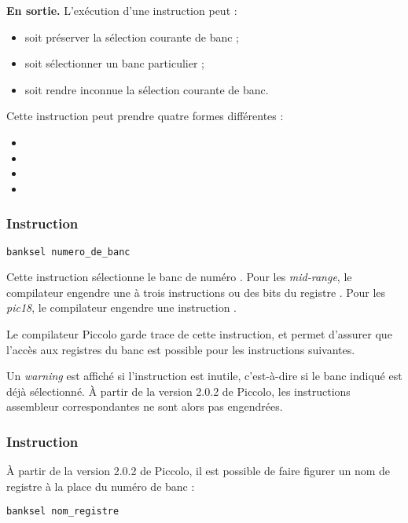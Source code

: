\textbf{En sortie.} L'exécution d'une instruction peut :
\begin{itemize}
  \item soit préserver la sélection courante de banc ;
  \item soit sélectionner un banc particulier ;
  \item soit rendre inconnue la sélection courante de banc.
\end{itemize}


Cette instruction peut prendre quatre formes différentes :
\begin{itemize}
  \item {}
  \item {}
  \item {}
  \item {}
\end{itemize}


\subsubsection{Instruction }
\begin{lstlisting}[language=piccolo]
banksel numero_de_banc
\end{lstlisting}

Cette instruction sélectionne le banc de numéro . Pour les \emph{mid-range}, le compilateur engendre une à trois instructions  ou  des bits  du registre . Pour les \emph{pic18}, le compilateur engendre une instruction .

Le compilateur Piccolo garde trace de cette instruction, et permet d'assurer que l'accès aux registres du banc  est possible pour les instructions suivantes.

Un \emph{warning} est affiché si l'instruction est inutile, c'est-à-dire si le banc indiqué est déjà sélectionné. À partir de la version 2.0.2 de Piccolo, les instructions assembleur correspondantes ne sont alors pas engendrées.






\subsubsection{Instruction }
À partir de la version 2.0.2 de Piccolo, il est possible de faire figurer un nom de registre à la place du numéro de banc :
\begin{lstlisting}[language=piccolo]
banksel nom_registre
\end{lstlisting}

